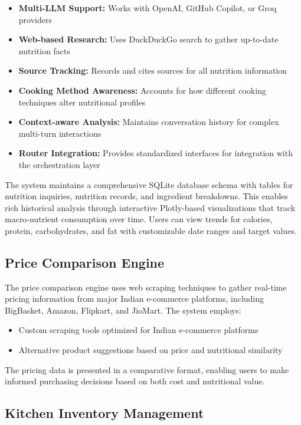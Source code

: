 \documentclass{ecai}
\begin{document}
\begin{itemize}[noitemsep,topsep=0pt]
    \item \textbf{Multi-LLM Support:} Works with OpenAI, GitHub Copilot, or Groq providers
    \item \textbf{Web-based Research:} Uses DuckDuckGo search to gather up-to-date nutrition facts
    \item \textbf{Source Tracking:} Records and cites sources for all nutrition information
    \item \textbf{Cooking Method Awareness:} Accounts for how different cooking techniques alter nutritional profiles
    \item \textbf{Context-aware Analysis:} Maintains conversation history for complex multi-turn interactions
    \item \textbf{Router Integration:} Provides standardized interfaces for integration with the orchestration layer
\end{itemize}

The system maintains a comprehensive SQLite database schema with tables for nutrition inquiries, nutrition records, and ingredient breakdowns. This enables rich historical analysis through interactive Plotly-based visualizations that track macro-nutrient consumption over time. Users can view trends for calories, protein, carbohydrates, and fat with customizable date ranges and target values.

\subsection{Price Comparison Engine}

The price comparison engine uses web scraping techniques to gather real-time pricing information from major Indian e-commerce platforms, including BigBasket, Amazon, Flipkart, and JioMart. The system employs:

\begin{itemize}[noitemsep,topsep=0pt]
    \item Custom scraping tools optimized for Indian e-commerce platforms
    \item Alternative product suggestions based on price and nutritional similarity
\end{itemize}

The pricing data is presented in a comparative format, enabling users to make informed purchasing decisions based on both cost and nutritional value.

\subsection{Kitchen Inventory Management}
\end{document}
